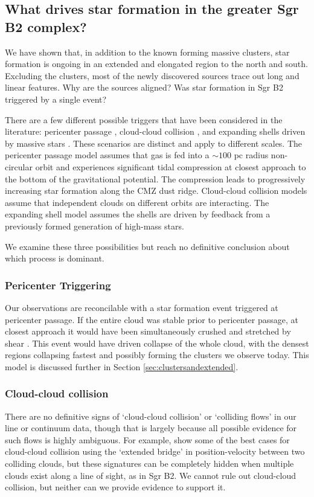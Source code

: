 \documentclass[twocolumn]{aastex61}
\begin{document}
\subsection{What drives star formation in the greater Sgr B2 complex?}
\label{sec:whatdrives}
We have shown that, in addition to the known forming massive clusters,
star formation is ongoing in an extended and elongated region to the north
and south.  Excluding the clusters, most of the newly discovered sources
trace out long and linear features.  Why are the sources aligned?
Was star formation in Sgr B2 triggered by a single event?

There are a few different possible triggers that have been considered in the
literature: pericenter passage \citep{Kruijssen2015a}, cloud-cloud collision
\citep{Hasegawa1994a,Mehringer1997a,Sato2000a}, and expanding shells driven by
massive stars \citep{Martin-Pintado1999a}.  These scenarios are distinct and
apply to different scales.  The pericenter passage model assumes that gas is
fed into a $\sim100$ pc radius non-circular orbit and experiences significant
tidal compression at closest approach to the bottom of the gravitational
potential.  The compression leads to progressively increasing star formation
along the CMZ dust ridge.  Cloud-cloud collision models assume that independent
clouds on different orbits are interacting.  The expanding shell model assumes
the shells are driven by feedback from a previously formed generation of
high-mass stars.

We examine these three possibilities but reach no definitive conclusion about
which process is dominant.

\subsubsection{Pericenter Triggering}
Our observations are reconcilable with a star formation event triggered
at pericenter passage.  If the entire cloud was stable prior to pericenter
passage, at closest approach it would have been simultaneously crushed and 
stretched by shear \citep{Kruijssen2015a}.  This event would have driven
collapse of the whole cloud, with the densest regions collapsing fastest
and possibly forming the clusters we observe today.  This model is discussed
further in Section \ref{sec:clustersandextended}.

\subsubsection{Cloud-cloud collision}
There are no definitive signs of `cloud-cloud collision' or `colliding flows'
in our line or continuum data, though that is largely because all possible
evidence for such flows is highly ambiguous. For example, \citet{Haworth2015c}
show some of the best cases for cloud-cloud collision using the `extended bridge'
in position-velocity between two colliding clouds, but these signatures can be 
completely hidden when multiple clouds exist along a line of sight, as in Sgr B2. 
We cannot rule out cloud-cloud collision, but neither can we provide evidence
to support it.
\end{document}
